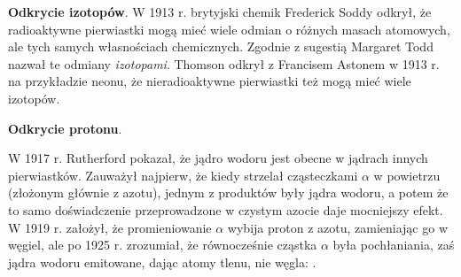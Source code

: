 \textbf{Odkrycie izotopów}.
W 1913 r. brytyjski chemik Frederick Soddy odkrył, że radioaktywne pierwiastki mogą mieć wiele odmian o różnych masach atomowych, ale tych samych własnościach chemicznych.
Zgodnie z sugestią Margaret Todd nazwał te odmiany \emph{izotopami}.
%
%
Thomson odkrył z Francisem Astonem w 1913 r. na przykładzie neonu, że nieradioaktywne pierwiastki też mogą mieć wiele izotopów.
%
%


\textbf{Odkrycie protonu}.


W 1917 r. Rutherford pokazał, że jądro wodoru jest obecne w jądrach innych pierwiastków.
Zauważył najpierw, że kiedy strzelał cząsteczkami $\alpha$ w powietrzu (złożonym głównie z azotu), jednym z produktów były jądra wodoru, a potem że to samo doświadczenie przeprowadzone w czystym azocie daje mocniejszy efekt.
W 1919 r. założył, że promieniowanie $\alpha$ wybija proton z azotu, zamieniając go w węgiel, ale po 1925 r. zrozumiał, że równocześnie cząstka $\alpha$ była pochłaniania, zaś jądra wodoru emitowane, dając atomy tlenu, nie węgla: .

